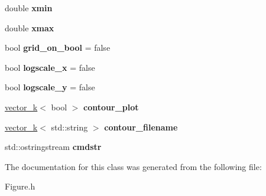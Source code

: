 \begin{DoxyCompactItemize}
\item 
\hypertarget{classkeycpp_1_1_plots_a1d027ed119d5b4a8d7d9ccc72f9a0eb1}{double {\bfseries xmin}}\label{classkeycpp_1_1_plots_a1d027ed119d5b4a8d7d9ccc72f9a0eb1}

\item 
\hypertarget{classkeycpp_1_1_plots_a4d7f34173d13de92014702ffba6fb1d4}{double {\bfseries xmax}}\label{classkeycpp_1_1_plots_a4d7f34173d13de92014702ffba6fb1d4}

\item 
\hypertarget{classkeycpp_1_1_plots_abd0c4449bcd999429a3073e2885708d8}{bool {\bfseries grid\-\_\-on\-\_\-bool} = false}\label{classkeycpp_1_1_plots_abd0c4449bcd999429a3073e2885708d8}

\item 
\hypertarget{classkeycpp_1_1_plots_aa994c8e9f09633b26410ed27ea70a1a1}{bool {\bfseries logscale\-\_\-x} = false}\label{classkeycpp_1_1_plots_aa994c8e9f09633b26410ed27ea70a1a1}

\item 
\hypertarget{classkeycpp_1_1_plots_a605e7e4681e977f5d1d2ff95d72946cb}{bool {\bfseries logscale\-\_\-y} = false}\label{classkeycpp_1_1_plots_a605e7e4681e977f5d1d2ff95d72946cb}

\item 
\hypertarget{classkeycpp_1_1_plots_a6732ae2dd213966e7eb812dba2a307a7}{\hyperlink{classkeycpp_1_1vector__k}{vector\-\_\-k}$<$ bool $>$ {\bfseries contour\-\_\-plot}}\label{classkeycpp_1_1_plots_a6732ae2dd213966e7eb812dba2a307a7}

\item 
\hypertarget{classkeycpp_1_1_plots_ac6617feee46a1e2b7f6c935e44b9e6ac}{\hyperlink{classkeycpp_1_1vector__k}{vector\-\_\-k}$<$ std\-::string $>$ {\bfseries contour\-\_\-filename}}\label{classkeycpp_1_1_plots_ac6617feee46a1e2b7f6c935e44b9e6ac}

\item 
\hypertarget{classkeycpp_1_1_plots_a0ed0add050a618468cbf2cffe2529bad}{std\-::ostringstream {\bfseries cmdstr}}\label{classkeycpp_1_1_plots_a0ed0add050a618468cbf2cffe2529bad}

\end{DoxyCompactItemize}


The documentation for this class was generated from the following file\-:\begin{DoxyCompactItemize}
\item 
Figure.\-h\end{DoxyCompactItemize}
